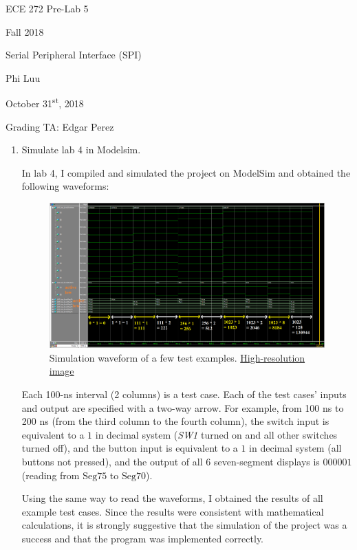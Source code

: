 \documentclass[12pt]{article}
\begin{document}
\begin{titlepage}
  \begin{center} \LARGE
    \vspace*{1.5in}

    ECE 272 Pre-Lab 5

    Fall 2018

    \vfill

    Serial Peripheral Interface (SPI)

    Phi Luu

    \vfill

    October 31\textsuperscript{st}, 2018

    Grading TA: Edgar Perez

    \vspace{1.5in}
  \end{center}
\end{titlepage}

\begin{enumerate}
  \item Simulate lab 4 in Modelsim.

  In lab 4, I compiled and simulated the project on ModelSim and obtained the following waveforms:

  \begin{figure}[ht]
    \centering
    \includegraphics[width=\textwidth]{lab4_simulation.png}
    \caption{Simulation waveform of a few test examples. \href{https://i.imgur.com/1UjCN6E.png}{High-resolution image}}
    \label{figure:3}
  \end{figure}

  Each 100-ns interval (2 columns) is a test case. Each of the test cases' inputs and output are specified with a two-way arrow. For example, from 100 ns to 200 ns (from the third column to the fourth column), the switch input is equivalent to a $1$ in decimal system (\textit{SW1} turned on and all other switches turned off), and the button input is equivalent to a $1$ in decimal system (all buttons not pressed), and the output of all 6 seven-segment displays is $000001$ (reading from $\text{Seg75}$ to $\text{Seg70}$).

  Using the same way to read the waveforms, I obtained the results of all example test cases. Since the results were consistent with mathematical calculations, it is strongly suggestive that the simulation of the project was a success and that the program was implemented correctly.

\end{enumerate}
\end{document}
